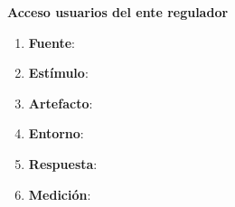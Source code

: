 {\bf Acceso usuarios del ente regulador}
\begin{enumerate}
\item {\bf Fuente}: 
\item {\bf Estímulo}: 
\item {\bf Artefacto}:  
\item {\bf Entorno}: 
\item {\bf Respuesta}: 
\item {\bf Medición}: 
\end{enumerate}
